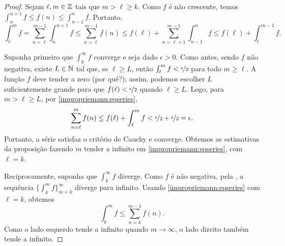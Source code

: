 \begin{proof}
Sejam $\ell,m \in {\mathbb{Z}}$ tais que $m>\ell\geq k$.
Como $f$ é não crescente, temos
$\int_{n}^{n+1} f \leq f(n) \leq \int_{n-1}^{n} f$. Portanto,
\begin{equation} \label{impropriemann:eqseries}
\int_\ell^m f
=
\sum_{n=\ell}^{m-1} \int_{n}^{n+1} f
\leq
\sum_{n=\ell}^{m-1} f(n)
\leq
f(\ell) +
\sum_{n=\ell+1}^{m-1} \int_{n-1}^{n} f
\leq
f(\ell)+
\int_\ell^{m-1} f .
\end{equation}

Suponha primeiro que $\int_k^\infty f$ converge e seja dado $\epsilon>0$.
Como antes, sendo $f$ não negativa, existe $L\in{\mathbb{N}}$ tal que, se $\ell\geq L$,
então $\int_\ell^m f < \nicefrac{\epsilon}{2}$ para todo $m\geq\ell$.
A função $f$ deve tender a zero (por quê?); assim, podemos escolher $L$
suficientemente grande para que $f(\ell)<\nicefrac{\epsilon}{2}$ quando
$\ell\geq L$. Logo, para $m>\ell\geq L$, por
\eqref{impropriemann:eqseries},
\begin{equation*}
\sum_{n=\ell}^{m} f(n)
\leq
f(\ell)+
\int_\ell^{m} f < \nicefrac{\epsilon}{2} + \nicefrac{\epsilon}{2} = \epsilon .
\end{equation*}
Portanto, a série satisfaz o critério de Cauchy e converge. Obtemos as estimativas da
proposição fazendo $m$ tender a infinito em \eqref{impropriemann:eqseries},
com $\ell=k$.

Reciprocamente, suponha que $\int_k^\infty f$ diverge.
Como $f$ é não negativa, pela ,
a sequência $\{\int_k^m f\}_{m=k}^\infty$ diverge para infinito.
Usando \eqref{impropriemann:eqseries} com $\ell=k$, obtemos
\begin{equation*}
\int_k^m f
\leq
\sum_{n=k}^{m-1} f(n) .
\end{equation*}
Como o lado esquerdo tende a infinito quando $m\to\infty$, o lado direito
também tende a infinito.
\end{proof}

